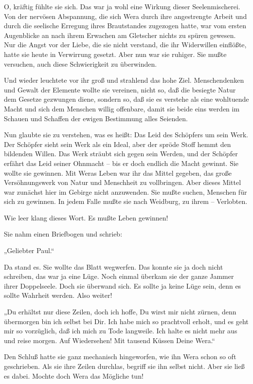 O, kräftig fühlte sie sich. Das war ja wohl eine Wirkung dieser
Seelenmischerei. Von der nervösen Abspannung, die sich Wera durch
ihre angestrengte Arbeit und durch die seelische Erregung ihres
Brautstandes zugezogen hatte, war vom ersten Augenblicke an nach
ihrem Erwachen am Gletscher nichts zu spüren gewesen. Nur die Angst
vor der Liebe, die sie nicht verstand, die ihr Widerwillen
einflößte, hatte sie heute in Verwirrung gesetzt. Aber nun war sie
ruhiger. Sie mußte versuchen, auch diese Schwierigkeit zu
überwinden.

Und wieder leuchtete vor ihr groß und strahlend das hohe Ziel.
Menschendenken und Gewalt der Elemente wollte sie vereinen, nicht
so, daß die besiegte Natur dem Gesetze gezwungen diene, sondern so,
daß sie es verstehe als eine wohltuende Macht und sich dem Menschen
willig offenbare, damit sie beide eins werden im Schauen und
Schaffen der ewigen Bestimmung alles Seienden.

Nun glaubte sie zu verstehen, was es heißt: Das Leid des Schöpfers
um sein Werk. Der Schöpfer sieht sein Werk als ein Ideal, aber der
spröde Stoff hemmt den bildenden Willen. Das Werk sträubt sich
gegen sein Werden, und der Schöpfer erfährt das Leid seiner
Ohnmacht – bis er doch endlich die Macht gewinnt. Sie wollte sie
gewinnen. Mit Weras Leben war ihr das Mittel gegeben, das große
Versöhnungswerk von Natur und Menschheit zu vollbringen. Aber
dieses Mittel war zunächst hier im Gebirge nicht anzuwenden. Sie
mußte suchen, Menschen für sich zu gewinnen. In jedem Falle mußte
sie nach Weidburg, zu ihrem – Verlobten.

Wie leer klang dieses Wort. Es mußte Leben gewinnen!

Sie nahm einen Briefbogen und schrieb:

„Geliebter Paul.“

Da stand es. Sie wollte das Blatt wegwerfen. Das konnte sie ja doch
nicht schreiben, das war ja eine Lüge. Noch einmal überkam sie der
ganze Jammer ihrer Doppelseele. Doch sie überwand sich. Es sollte
ja keine Lüge sein, denn es sollte Wahrheit werden. Also weiter!

„Du erhältst nur diese Zeilen, doch ich hoffe, Du wirst mir nicht
zürnen, denn übermorgen bin ich selbst bei Dir. Ich habe mich so
prachtvoll erholt, und es geht mir so vorzüglich, daß ich mich zu
Tode langweile. Ich halte es nicht mehr aus und reise morgen. Auf
Wiedersehen! Mit tausend Küssen Deine Wera.“

Den Schluß hatte sie ganz mechanisch hingeworfen, wie ihn Wera
schon so oft geschrieben. Als sie ihre Zeilen durchlas, begriff sie
ihn selbst nicht. Aber sie ließ es dabei. Mochte doch Wera das
Mögliche tun!

